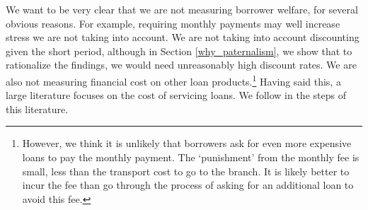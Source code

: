 \documentclass[12pt, a4paper]{article}
\begin{document}
We want to be very clear that we are not measuring borrower welfare, for several obvious reasons. For example, requiring monthly payments may well increase stress we are not taking into account. We are not taking into account discounting given the short period, although in Section \ref{why_paternalism}, we show that to rationalize the findings, we would need unreasonably high discount rates. We are also not measuring financial cost on other loan products.\footnote{However, we think it is unlikely that borrowers ask for even more expensive loans to pay the monthly payment. The `punishment' from the monthly fee is small, less than the transport cost to go to the branch. It is likely better to incur the fee than go through the process of asking for an additional loan to avoid this fee.} Having said this, a large literature focuses on the cost of servicing loans. We follow in the steps of this literature. 





\end{document}
